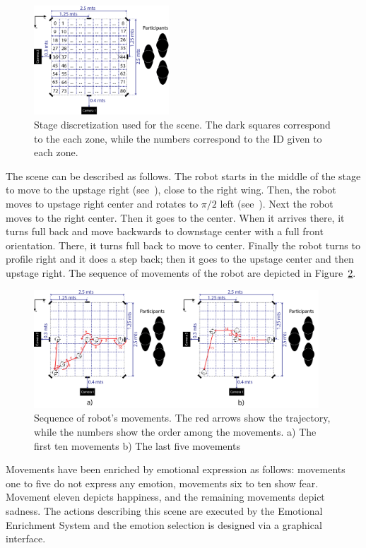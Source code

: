 \begin{figure}
	\centering
	\includegraphics[width=0.45\textwidth]{./Images/FourthCaseScene.png} 
	\caption{Stage discretization  used for the scene. The dark squares correspond to the each zone, while the numbers correspond to the ID given to each zone.}
	\label{fig:stage_division}
\end{figure} 

The scene can be described as follows. The robot starts in the middle of the stage to move to the upstage right (see~\cite{Musical}), close to the right wing. Then, the robot moves to upstage right center and rotates to $\pi/2$ left (see~\cite{Artopia}). Next the robot moves to the right center. Then it goes to the center. When it arrives there, it turns full back and move backwards to downstage center with a full front orientation. There, it turns full back to move to center. Finally the robot turns to profile right and it does a step back; then it goes to the upstage center and then upstage right. The sequence of movements of the robot are depicted in Figure~\ref{fig:movement}.
\begin{figure}
	\centering
	\includegraphics[width=0.95\textwidth]{./Images/fourthCaseSceneD.png} 
	\caption{Sequence of robot's movements. The red arrows show the trajectory, while the numbers show the order among the movements. a) The first ten movements b) The last five movements }
	\label{fig:movement}
\end{figure}

Movements have been enriched by emotional expression as follows: movements one to five do not express any emotion, movements six to ten show fear. Movement eleven depicts happiness, and the remaining movements depict sadness. The actions describing this scene are executed by the Emotional Enrichment System and the emotion selection is designed via a graphical interface.

